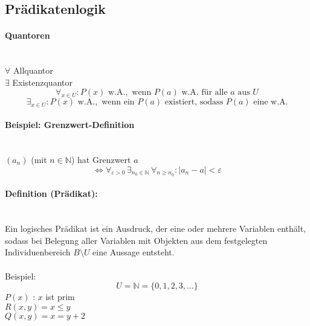 \subsection{Prädikatenlogik}
\paragraph{Quantoren}
\ \\$ \forall $ Allquantor \\
$ \exists $ Existenzquantor \\

\[
\forall_{x\in U}:P(x) \text{ w.A.},\text{ wenn }P(a) \text{ w.A. f\"ur alle } a \text{ aus } U
\]
\[
\exists_{x\in U}:P(x) \text{ w.A.},\text{ wenn ein }P(a) \text{ existiert, sodass } P(a) \text{ eine w.A.}
\]

\paragraph{Beispiel: Grenzwert-Definition}
\ \\
$(a_n)$ (mit $n\in \mathbb{N}$) hat Grenzwert $a$
\[
\Leftrightarrow \forall_{\varepsilon > 0} \, \exists_{n_0 \in \mathbb{N}} \, \forall_{n \geq n_0}: |a_n - a| < \varepsilon
\]

\paragraph{Definition (Pr\"adikat):}
\ \\
\glqq Ein logisches Pr\"adikat ist ein Ausdruck, der eine oder mehrere Variablen enth\"alt, sodass bei Belegung aller Variablen mit Objekten aus dem festgelegten Individuenbereich $B\setminus U$ eine Aussage entsteht.\grqq \\
\ \\
Beispiel:\\
\[
U=\mathbb{N}=\{0,1,2,3,\ldots\}
\]
$P(x)$ : \glq $x$ ist prim\grq \\
$R(x,y) = $\glq$x \leq y$\grq \\
$Q(x,y) = $\glq$x=y+2$\grq

